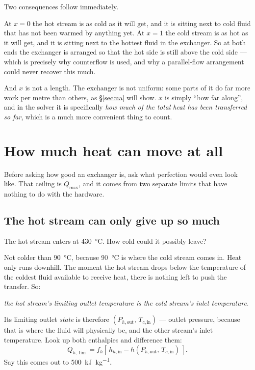 \documentclass[11pt,a4paper]{report}
\begin{document}
Two consequences follow immediately.

At $x=0$ the hot stream is as cold as it will get, and it is sitting next to
cold fluid that has not been warmed by anything yet. At $x=1$ the cold
stream is as hot as it will get, and it is sitting next to the hottest fluid
in the exchanger. So at both ends the exchanger is arranged so that the hot
side is still above the cold side --- which is precisely why counterflow is
used, and why a parallel-flow arrangement could never recover this much.

And $x$ is not a length. The exchanger is not uniform: some parts of it do
far more work per metre than others, as \S\ref{sec:ua} will show. $x$ is
simply ``how far along'', and in the solver it is specifically \emph{how
much of the total heat has been transferred so far}, which is a much more
convenient thing to count.

\section{How much heat can move at all}
\label{sec:qmax}

Before asking how good an exchanger is, ask what perfection would even look
like. That ceiling is $Q_{\max}$, and it comes from two separate limits that
have nothing to do with the hardware.

\subsection{The hot stream can only give up so much}

The hot stream enters at \SI{430}{\celsius}. How cold could it possibly
leave?

Not colder than \SI{90}{\celsius}, because \SI{90}{\celsius} is where the
cold stream comes in. Heat only runs downhill. The moment the hot stream
drops below the temperature of the coldest fluid available to receive heat,
there is nothing left to push the transfer. So:

\begin{center}
\emph{the hot stream's limiting outlet temperature is the cold stream's
inlet temperature.}
\end{center}

\noindent Its limiting outlet \emph{state} is therefore
$(P_{h,\mathrm{out}},\, T_{c,\mathrm{in}})$ --- outlet pressure, because
that is where the fluid will physically be, and the other stream's inlet
temperature. Look up both enthalpies and difference them:
\[
  Q_{h,\lim} = f_h \left[\, h_{h,\mathrm{in}}
  - h(P_{h,\mathrm{out}},\, T_{c,\mathrm{in}}) \,\right].
\]
Say this comes out to \SI{500}{\kilo\joule\per\kilogram}.
\end{document}
